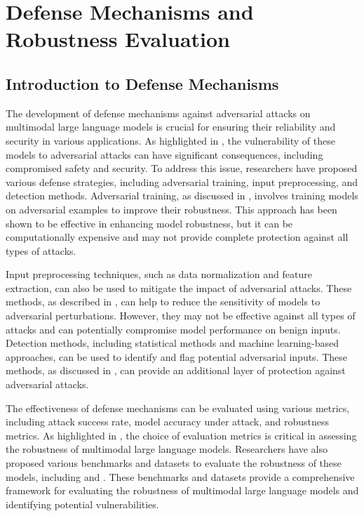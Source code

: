 \documentclass[11pt,a4paper]{article}
\begin{document}
\section{Defense Mechanisms and Robustness Evaluation}



\subsection{Introduction to Defense Mechanisms}


The development of defense mechanisms against adversarial attacks on multimodal large language models is crucial for ensuring their reliability and security in various applications. As highlighted in \cite{doi:10.18653/v1/n19-1314}, the vulnerability of these models to adversarial attacks can have significant consequences, including compromised safety and security. To address this issue, researchers have proposed various defense strategies, including adversarial training, input preprocessing, and detection methods. Adversarial training, as discussed in \cite{arxiv:2309.00614}, involves training models on adversarial examples to improve their robustness. This approach has been shown to be effective in enhancing model robustness, but it can be computationally expensive and may not provide complete protection against all types of attacks.

Input preprocessing techniques, such as data normalization and feature extraction, can also be used to mitigate the impact of adversarial attacks. These methods, as described in \cite{arxiv:2408.13461}, can help to reduce the sensitivity of models to adversarial perturbations. However, they may not be effective against all types of attacks and can potentially compromise model performance on benign inputs. Detection methods, including statistical methods and machine learning-based approaches, can be used to identify and flag potential adversarial inputs. These methods, as discussed in \cite{doi:10.1007/s44267-025-00079-w}, can provide an additional layer of protection against adversarial attacks.

The effectiveness of defense mechanisms can be evaluated using various metrics, including attack success rate, model accuracy under attack, and robustness metrics. As highlighted in \cite{arxiv:2408.08632}, the choice of evaluation metrics is critical in assessing the robustness of multimodal large language models. Researchers have also proposed various benchmarks and datasets to evaluate the robustness of these models, including \cite{arxiv:2402.14154} and \cite{arxiv:2408.13257}. These benchmarks and datasets provide a comprehensive framework for evaluating the robustness of multimodal large language models and identifying potential vulnerabilities.
\end{document}
